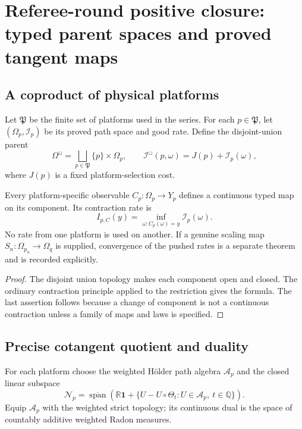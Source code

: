 \section{Referee-round positive closure: typed parent spaces and proved tangent maps}
\label{sec:rr2-c2}

\subsection{A coproduct of physical platforms}

Let \(\mathfrak P\) be the finite set of platforms used in the series.  For
each \(p\in\mathfrak P\), let \((\Omega_p,\mathcal I_p)\) be its proved path
space and good rate.  Define the disjoint-union parent
\[
 \Omega^\sqcup=\bigsqcup_{p\in\mathfrak P}\{p\}\times\Omega_p,\qquad
 \mathcal I^\sqcup(p,\omega)=J(p)+\mathcal I_p(\omega),
\]
where \(J(p)\) is a fixed platform-selection cost.

\begin{theorem}
\label{thm:rr2-c2-coproduct}
Every platform-specific observable \(C_p:\Omega_p\to Y_p\) defines a
continuous typed map on its component.  Its contraction rate is
\[
 I_{p,C}(y)=\inf_{\omega:C_p(\omega)=y}\mathcal I_p(\omega).
\]
No rate from one platform is used on another.  If a genuine scaling map
\(S_n:\Omega_{p_n}\to\Omega_q\) is supplied, convergence of the pushed rates
is a separate theorem and is recorded explicitly.
\end{theorem}

\begin{proof}
The disjoint union topology makes each component open and closed.  The
ordinary contraction principle applied to the restriction gives the
formula.  The last assertion follows because a change of component is not a
continuous contraction unless a family of maps and laws is specified.
\end{proof}

\subsection{Precise cotangent quotient and duality}

For each platform choose the weighted Hölder path algebra \(\mathscr A_p\)
and the closed linear subspace
\[
 \mathscr N_p=
 \overline{\operatorname{span}}\left(
 \mathbb R\mathbf1+
 \{U-U\circ\Theta_t:U\in\mathscr A_p,\ t\in\mathbb Q\}
 \right).
\]
Equip \(\mathscr A_p\) with the weighted strict topology; its continuous dual
is the space of countably additive weighted Radon measures.

